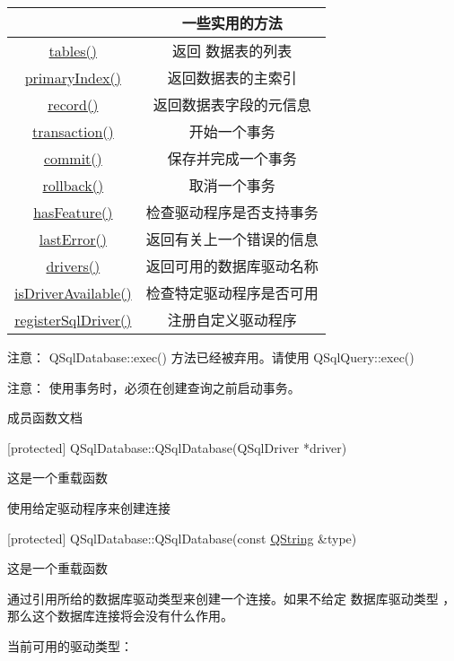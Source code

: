 \begin{tabular}{|c|c|}
	\hline	
		& 一些实用的方法\\
	\hline
	\href{https://github.com/QtDocumentCN/QtDocumentCN/blob/master/Src/S/QSqlDatabase/QSqlDatabase.md#qstringlist-qsqldatabasetablesqsqltabletype-type--qsqltables-const}{tables()} &	返回 数据表的列表\\
		\hline
	\href{https://github.com/QtDocumentCN/QtDocumentCN/blob/master/Src/S/QSqlDatabase/QSqlDatabase.md#qsqlindex-qsqldatabaseprimaryindexconst-qstring-tablename-const}{primaryIndex()} &返回数据表的主索引\\
		\hline
	\href{URL}{record()} &	返回数据表字段的元信息\\
		\hline
	\href{URL}{transaction()} &开始一个事务\\
		\hline
	\href{URL}{commit()}&	保存并完成一个事务\\
		\hline
	\href{URL}{rollback()}&	取消一个事务\\
		\hline
	\href{URL}{hasFeature()}&	检查驱动程序是否支持事务\\
		\hline
	\href{URL}{lastError()}	&返回有关上一个错误的信息\\
		\hline
	\href{URL}{drivers()}	&返回可用的数据库驱动名称\\
		\hline
	\href{URL}{isDriverAvailable()}	&检查特定驱动程序是否可用\\
		\hline
	\href{URL}{registerSqlDriver()}	&注册自定义驱动程序\\
		\hline
\end{tabular}

注意： QSqlDatabase::exec() 方法已经被弃用。请使用 QSqlQuery::exec()

注意： 使用事务时，必须在创建查询之前启动事务。


成员函数文档

[protected] QSqlDatabase::QSqlDatabase(QSqlDriver *driver)

这是一个重载函数

使用给定驱动程序来创建连接

[protected] QSqlDatabase::QSqlDatabase(const \href{https://github.com/QtDocumentCN/QtDocumentCN/blob/master/Src/S/QString/QString.md}{QString} \&type)

这是一个重载函数

通过引用所给的数据库驱动类型来创建一个连接。如果不给定 数据库驱动类型 ，那么这个数据库连接将会没有什么作用。

当前可用的驱动类型：

